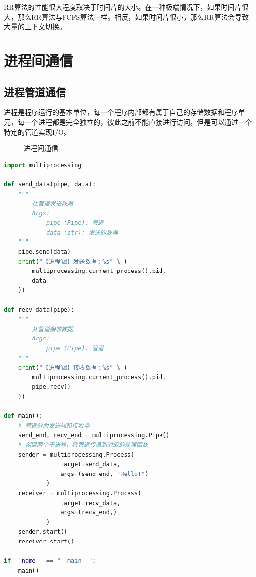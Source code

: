 RR算法的性能很大程度取决于时间片的大小。在一种极端情况下，如果时间片很大，那么RR算法与FCFS算法一样。相反，如果时间片很小，那么RR算法会导致大量的上下文切换。

\newpage

\section{进程间通信}

\subsection{进程管道通信}

进程是程序运行的基本单位，每一个程序内部都有属于自己的存储数据和程序单元，每一个进程都是完全独立的，彼此之前不能直接进行访问。但是可以通过一个特定的管道实现I/O。

\begin{figure}[H]
    \centering
    \caption{进程间通信}
\end{figure}

\vspace{0.5cm}


\begin{lstlisting}[language=Python]
import multiprocessing

def send_data(pipe, data):
	"""
		往管道发送数据
		Args:
			pipe (Pipe): 管道
			data (str): 发送的数据
	"""
	pipe.send(data)
	print("【进程%d】发送数据：%s" % (
		multiprocessing.current_process().pid,
		data
	))

def recv_data(pipe):
	"""
		从管道接收数据
		Args:
			pipe (Pipe): 管道
	"""
	print("【进程%d】接收数据：%s" % (
		multiprocessing.current_process().pid, 
		pipe.recv()
	))

def main():
	# 管道分为发送端和接收端
	send_end, recv_end = multiprocessing.Pipe()
	# 创建两个子进程，将管道传递到对应的处理函数
	sender = multiprocessing.Process(
				target=send_data,
				args=(send_end, "Hello!")
			)
	receiver = multiprocessing.Process(
				target=recv_data,
				args=(recv_end,)
			)
	sender.start()
	receiver.start()

if __name__ == "__main__":
	main()
\end{lstlisting}

